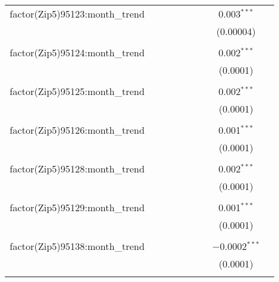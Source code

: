 \begin{table}[H]
{\begin{tabular}{@{\extracolsep{5pt}}lcccccccc}
  factor(Zip5)95123:month\_trend &  &  &  &  &  &  & 0.003$^{***}$ &  \\  

   &  &  &  &  &  &  & (0.00004) &  \\  

   & & & & & & & & \\  

  factor(Zip5)95124:month\_trend &  &  &  &  &  &  & 0.002$^{***}$ &  \\  

   &  &  &  &  &  &  & (0.0001) &  \\  

   & & & & & & & & \\  

  factor(Zip5)95125:month\_trend &  &  &  &  &  &  & 0.002$^{***}$ &  \\  

   &  &  &  &  &  &  & (0.0001) &  \\  

   & & & & & & & & \\  

  factor(Zip5)95126:month\_trend &  &  &  &  &  &  & 0.001$^{***}$ &  \\  

   &  &  &  &  &  &  & (0.0001) &  \\  

   & & & & & & & & \\  

  factor(Zip5)95128:month\_trend &  &  &  &  &  &  & 0.002$^{***}$ &  \\  

   &  &  &  &  &  &  & (0.0001) &  \\  

   & & & & & & & & \\  

  factor(Zip5)95129:month\_trend &  &  &  &  &  &  & 0.001$^{***}$ &  \\  

   &  &  &  &  &  &  & (0.0001) &  \\  

   & & & & & & & & \\  

  factor(Zip5)95138:month\_trend &  &  &  &  &  &  & $-$0.0002$^{***}$ &  \\  

   &  &  &  &  &  &  & (0.0001) &  \\  

   & & & & & & & & \\  


\end{tabular}}
\end{table}

